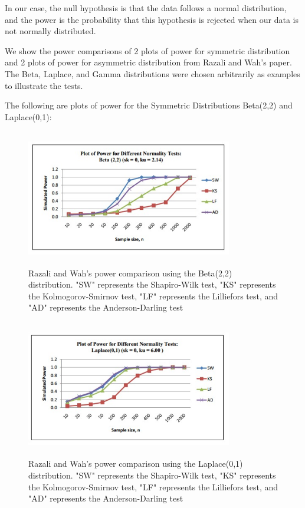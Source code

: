 \documentclass[letterpaper,english, 12pt]{article}
\begin{document}
In our case, the null hypothesis is that the data follows a normal distribution, and the power is the probability that this hypothesis is rejected when our data is not normally distributed.  

We show the power comparisons of 2 plots of power for symmetric distribution and 2 plots of power for asymmetric distribution from Razali and Wah's paper. The Beta, Laplace, and Gamma distributions were chosen arbitrarily as examples to illustrate the tests.

The following are plots of power for the Symmetric Distributions Beta(2,2) and Laplace(0,1):

\begin{figure}[H]
	\centering
	\includegraphics[height=6cm,width=90mm]{pics/razali1.jpg}
	\caption{Razali and Wah's power comparison using the Beta(2,2) distribution. "SW" represents the Shapiro-Wilk test, "KS" represents the Kolmogorov-Smirnov test, "LF" represents the Lilliefors test, and "AD" represents the Anderson-Darling test}
\end{figure}

\begin{figure}[H]
	\centering
	\includegraphics[height=6cm,width=90mm]{pics/razali2.jpg}
	\caption{Razali and Wah's power comparison using the Laplace(0,1) distribution. "SW" represents the Shapiro-Wilk test, "KS" represents the Kolmogorov-Smirnov test, "LF" represents the Lilliefors test, and "AD" represents the Anderson-Darling test}
\end{figure}
\end{document}

